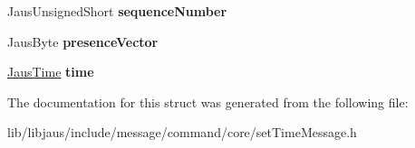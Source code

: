 \begin{DoxyCompactItemize}
\item 
\hypertarget{struct_set_time_message_struct_a3a4b2f1a8ee12d3b6ef1d1691a7105cc}{\-Jaus\-Unsigned\-Short {\bfseries sequence\-Number}}\label{struct_set_time_message_struct_a3a4b2f1a8ee12d3b6ef1d1691a7105cc}

\item 
\hypertarget{struct_set_time_message_struct_adffbf587b18649a433947d02cecb7496}{\-Jaus\-Byte {\bfseries presence\-Vector}}\label{struct_set_time_message_struct_adffbf587b18649a433947d02cecb7496}

\item 
\hypertarget{struct_set_time_message_struct_a46b1a397e266e7b5c6c6e288beef4099}{\hyperlink{struct_jaus_time_struct}{\-Jaus\-Time} {\bfseries time}}\label{struct_set_time_message_struct_a46b1a397e266e7b5c6c6e288beef4099}

\end{DoxyCompactItemize}


\-The documentation for this struct was generated from the following file\-:\begin{DoxyCompactItemize}
\item 
lib/libjaus/include/message/command/core/set\-Time\-Message.\-h\end{DoxyCompactItemize}
